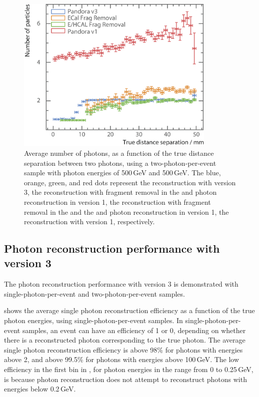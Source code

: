 \begin{figure}[tbph]
\centering
\includegraphics[width=0.85\textwidth]{photon/DoubleCompareAlg4}
\caption[Average number of photons, as a function of the MC distance separation for different algorithms combinations.]
{Average number of photons, as a function of the true distance separation between two photons, using a two-photon-per-event sample with photon energies of  500\,GeV and 500\,GeV. The blue, orange, green, and red dots represent the reconstruction with \pandora version 3, the reconstruction with fragment removal in the \ECAL and photon reconstruction in  \pandora version 1,  the reconstruction with fragment removal in the \ECAL and the \HCAL and photon reconstruction in  \pandora version 1, the reconstruction with \pandora version 1, respectively.}
\label{fig:photonDoubleCompareAlgs}
\end{figure}

\subsection{Photon reconstruction performance with \pandora version 3}

The photon reconstruction performance with \pandora version 3 is demonstrated with  single-photon-per-event and  two-photon-per-event samples.

 shows the average single photon reconstruction  efficiency as a function of the true photon energies, using single-photon-per-event samples.  In single-photon-per-event samples, an event can have an efficiency of 1 or 0, depending on whether there is a reconstructed photon  corresponding to the true photon. The average single photon reconstruction efficiency is above 98\% for photons with energies above 2\GeV, and above 99.5\% for photons  with energies  above 100\,GeV.  The low efficiency in the first bin in , for photon energies in the range from 0 to 0.25\,GeV, is because photon reconstruction does not attempt to reconstruct photons with energies below 0.2\,GeV.

